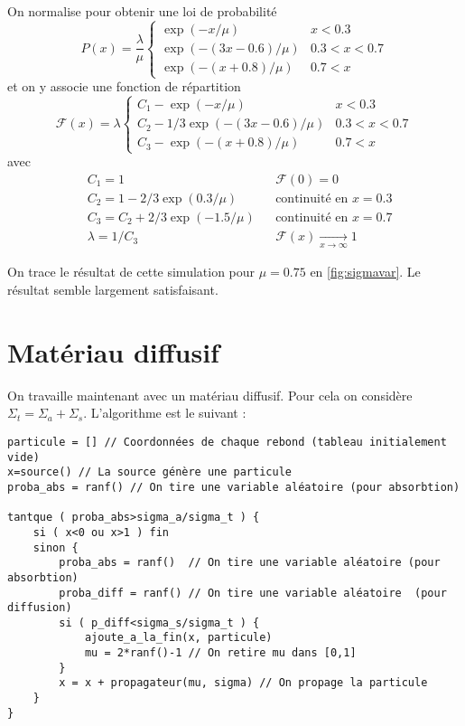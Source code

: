 \documentclass[11pt,a4paper]{article}
\newcommand{\F}{\mathcal{F}}
\begin{document}
On normalise pour obtenir une loi de probabilité
\begin{equation}
  P(x) = \frac{\lambda}{\mu}
  \begin{cases}
    \exp(-x/\mu)         & x<0.3\\
    \exp(-(3x-0.6)/\mu) & 0.3<x<0.7\\
    \exp(-(x+0.8)/\mu)  & 0.7<x
  \end{cases}
\end{equation}
et on y associe une fonction de répartition
\begin{equation}
  \F(x) = \lambda
  \begin{cases}
    C_1 - \exp(-x/\mu)             & x<0.3\\    
    C_2 - 1/3 \exp(-(3x-0.6)/\mu) & 0.3<x<0.7\\
    C_3 - \exp(-(x+0.8)/\mu)      & 0.7<x      
  \end{cases}
\end{equation}
avec
\begin{align}
  &C_1 = 1 && \F(0)=0 \\
  &C_2 = 1 - 2/3 \exp(0.3/\mu) && \mbox{continuité en }x=0.3 \\
  &C_3 = C_2 + 2/3 \exp(-1.5/\mu) &&  \mbox{continuité en }x=0.7 \\
  &\lambda = 1/C_3 &&  \F(x)  \xrightarrow[x \to \infty]{} 1
\end{align}

On trace le résultat de cette simulation pour $\mu=0.75$ en \autoref{fig:sigmavar}. Le résultat semble largement satisfaisant.


\section{Matériau diffusif}

On travaille maintenant avec un matériau diffusif. Pour cela on considère $\Sigma_t = \Sigma_a + \Sigma_s$. L'algorithme est le suivant : 

\begin{verbatim}
particule = [] // Coordonnées de chaque rebond (tableau initialement vide) 
x=source() // La source génère une particule                                      
proba_abs = ranf() // On tire une variable aléatoire (pour absorbtion)

tantque ( proba_abs>sigma_a/sigma_t ) {
    si ( x<0 ou x>1 ) fin 
    sinon {
        proba_abs = ranf()  // On tire une variable aléatoire (pour absorbtion)
        proba_diff = ranf() // On tire une variable aléatoire  (pour diffusion)
        si ( p_diff<sigma_s/sigma_t ) {
            ajoute_a_la_fin(x, particule)
            mu = 2*ranf()-1 // On retire mu dans [0,1]
        }
        x = x + propagateur(mu, sigma) // On propage la particule
    }
}
\end{verbatim}
\end{document}
